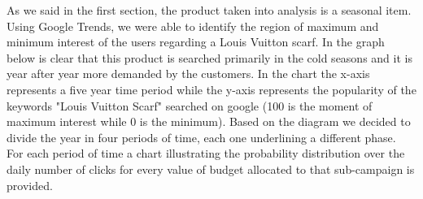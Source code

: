 As we said in the first section, the product taken into analysis is a seasonal item. Using Google Trends, we were able to identify the region of maximum and minimum interest of the users regarding a Louis Vuitton scarf. In the graph below is clear that this product is searched primarily in the cold seasons and it is year after year more demanded by the customers. In the chart the x-axis represents a five year time period while the y-axis represents the popularity of the keywords "Louis Vuitton Scarf" searched on google (100 is the moment of maximum interest while 0 is the minimum).
Based on the diagram we decided to divide the year in four periods of time, each one underlining a different phase.\newline\\
For each period of time a chart illustrating the probability distribution over the daily number of clicks for every value of budget allocated to that sub-campaign is provided.\newline
{} 
